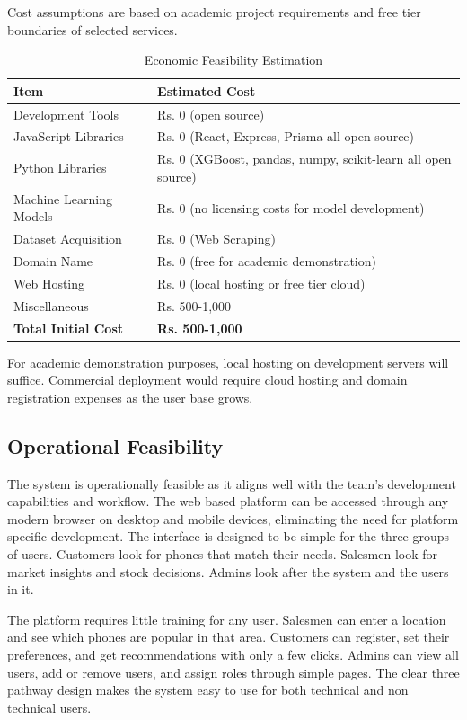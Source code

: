 \documentclass[12pt, a4paper]{report}
\numberwithin{equation}{chapter}
\begin{document}
Cost assumptions are based on academic project requirements and free tier boundaries of selected services.

\begin{table}[!ht]
\centering
\caption{Economic Feasibility Estimation}
\label{tab:economic}
\begin{tabular}{|p{6cm}|p{6cm}|}
\hline
\textbf{Item} & \textbf{Estimated Cost} \\
\hline
Development Tools & Rs. 0 (open source) \\
\hline
JavaScript Libraries & Rs. 0 (React, Express, Prisma all open source) \\
\hline
Python Libraries & Rs. 0 (XGBoost, pandas, numpy, scikit-learn all open source) \\
\hline
Machine Learning Models & Rs. 0 (no licensing costs for model development) \\
\hline
Dataset Acquisition & Rs. 0 (Web Scraping) \\
\hline
Domain Name & Rs. 0 (free for academic demonstration) \\
\hline
Web Hosting & Rs. 0 (local hosting or free tier cloud) \\
\hline
Miscellaneous & Rs. 500-1,000 \\
\hline
\textbf{Total Initial Cost} & \textbf{Rs. 500-1,000} \\
\hline
\end{tabular}
\end{table}

For academic demonstration purposes, local hosting on development servers will suffice. Commercial deployment would require cloud hosting and domain registration expenses as the user base grows.

\subsection{Operational Feasibility}

The system is operationally feasible as it aligns well with the team's development capabilities and workflow. The web based platform can be accessed through any modern browser on desktop and mobile devices, eliminating the need for platform specific development. The interface is designed to be simple for the three groups of users. Customers look for phones that match their needs. Salesmen look for market insights and stock decisions. Admins look after the system and the users in it.

The platform requires little training for any user. Salesmen can enter a location and see which phones are popular in that area. Customers can register, set their preferences, and get recommendations with only a few clicks. Admins can view all users, add or remove users, and assign roles through simple pages. The clear three pathway design makes the system easy to use for both technical and non technical users.
\end{document}
